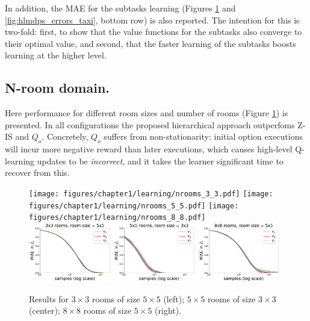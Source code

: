 In addition, the MAE for the subtasks learning (Figures \ref{fig:hlmdps_errors_nrooms} and \ref{fig:hlmdps_errors_taxi}, bottom row) is also reported. The intention for this is two-fold: first, to show that the value functions for the subtasks also converge to their optimal value, and second, that the faster learning of the subtasks boosts learning at the higher level.

\subsection{N-room domain.}
Here performance for different room sizes and number of rooms (Figure \ref{fig:hlmdps_errors_nrooms}) is presented. In all configurations the proposed hierarchical approach outperfoms Z-IS and $Q_o$. Concretely, $Q_o$ suffers from non-stationarity: initial option executions will incur more negative reward than later executions, which causes high-level Q-learning updates to be {\em incorrect}, and it takes the learner significant time to recover from this.

\begin{figure}[!htb]
\centering
\texttt{[image: figures/chapter1/learning/nrooms\_3\_3.pdf]}
\texttt{[image: figures/chapter1/learning/nrooms\_5\_5.pdf]}
\texttt{[image: figures/chapter1/learning/nrooms\_8\_8.pdf]}
\includegraphics[width=0.32\textwidth]{figures/chapter1/subtasks/nrooms_3_3_subtasks.pdf}
\includegraphics[width=0.32\textwidth]{figures/chapter1/subtasks/nrooms_5_5_subtasks.pdf}
\includegraphics[width=0.32\textwidth]{figures/chapter1/subtasks/nrooms_8_8_subtasks.pdf}
\caption{ Results for $3\times 3$ rooms of size $5 \times 5$ (left);
$5\times 5$ rooms of size $3 \times 3$ (center); $8 \times 8$ rooms of size $5\times 5$ (right).}
\label{fig:hlmdps_errors_nrooms}
\end{figure}

